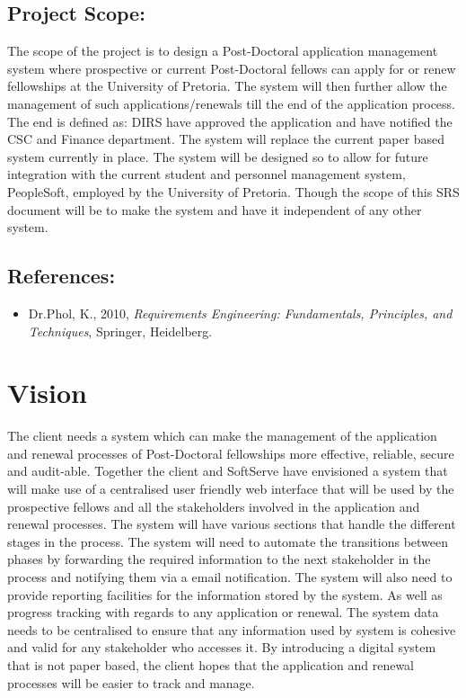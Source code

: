 \documentclass[12pt]{article}
\begin{document}
\subsection{Project Scope:}
\vspace{0.2in}	
The scope of the project is to design a Post-Doctoral application management system where prospective or current Post-Doctoral fellows can apply for or renew fellowships at the University of Pretoria. The system will then further allow the management of such applications/renewals till the end of the application process. The end is defined as: DIRS have approved the application and have notified the CSC and Finance department. The system will replace the current paper based system currently in place. The system will be designed so to allow for future integration with the current student and personnel management system, PeopleSoft, employed by the University of Pretoria. Though the scope of this SRS document will be to make the system and have it independent of any other system.
\vspace{0.2in}

\subsection{References:}
\vspace{0.1in}
\begin{itemize}
\item Dr.Phol, K., 2010, \textit{Requirements Engineering: Fundamentals, Principles, and Techniques}, Springer, Heidelberg.
\end{itemize}	

\vspace{0.5in}

\section{Vision} %
\vspace{0.2in}
The client needs a system which can make the management of the application and renewal processes of Post-Doctoral fellowships more effective, reliable, secure and audit-able. Together the client and SoftServe have envisioned a system that will make use of a centralised user friendly web interface that will be used by the prospective fellows and all the stakeholders involved in the application and renewal processes. The system will have various sections that handle the different stages in the process. The system will need to automate the transitions between phases by forwarding the required information to the next stakeholder in the process and notifying them via a email notification. The system will also need to provide reporting facilities for the information stored by the system. As well as progress tracking with regards to any application or renewal. The system data needs to be centralised to ensure that any information used by system is cohesive and valid for any stakeholder who accesses it. By introducing a digital system that is not paper based, the client hopes that the application and renewal processes will be easier to track and manage.
\vspace{0.5in}
\end{document}
